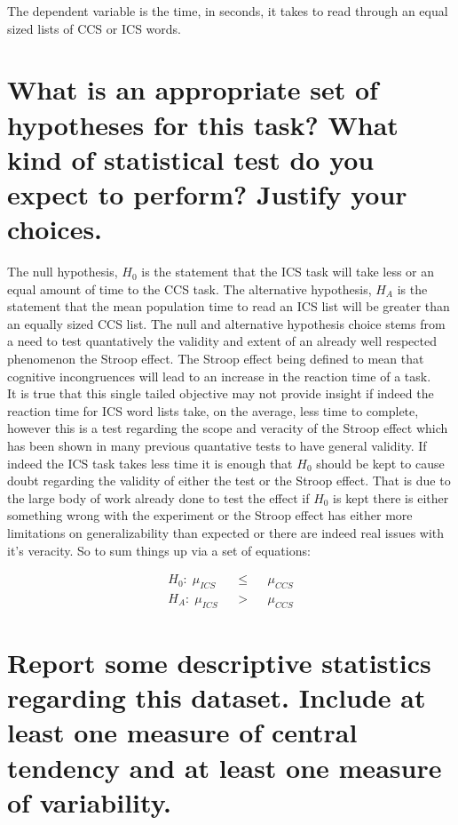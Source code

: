 \documentclass{article}
\begin{document}
The dependent variable is the time, in seconds, it takes to read through
an equal sized lists of CCS or ICS words.

\section{What is an appropriate set of hypotheses for this task? What
kind of statistical test do you expect to perform? Justify your
choices.}\label{what-is-an-appropriate-set-of-hypotheses-for-this-task-what-kind-of-statistical-test-do-you-expect-to-perform-justify-your-choices.}

The null hypothesis, \(H_0\) is the statement that the ICS task will
take less or an equal amount of time to the CCS task. The alternative
hypothesis, \(H_A\) is the statement that the mean population time to
read an ICS list will be greater than an equally sized CCS list. The
null and alternative hypothesis choice stems from a need to test
quantatively the validity and extent of an already well respected
phenomenon the Stroop effect. The Stroop effect being defined to mean
that cognitive incongruences will lead to an increase in the reaction
time of a task.\\ It is true that this single tailed objective may not
provide insight if indeed the reaction time for ICS word lists take, on
the average, less time to complete, however this is a test regarding the
scope and veracity of the Stroop effect which has been shown in many
previous quantative tests to have general validity. If indeed the ICS
task takes less time it is enough that \(H_0\) should be kept to cause
doubt regarding the validity of either the test or the Stroop effect.
That is due to the large body of work already done to test the effect if
\(H_0\) is kept there is either something wrong with the experiment or
the Stroop effect has either more limitations on generalizability than
expected or there are indeed real issues with it's veracity. So to sum
things up via a set of equations:

\begin{align}
H_0:\; \mu_{ICS} &&\le&& \mu_{CCS} \\
H_A:\; \mu_{ICS} &&>&& \mu_{CCS}
\end{align}

\section{Report some descriptive statistics regarding this dataset.
Include at least one measure of central tendency and at least one
measure of
variability.}\label{report-some-descriptive-statistics-regarding-this-dataset.-include-at-least-one-measure-of-central-tendency-and-at-least-one-measure-of-variability.}
\end{document}
